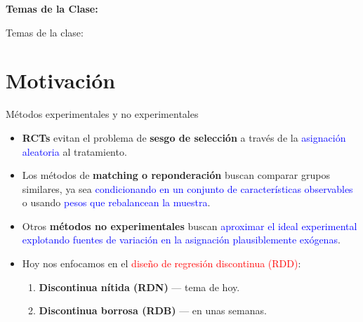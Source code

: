 \documentclass[10pt, xcolor=dvipsnames]{beamer}
\subtitle{Diseño de Regresión Discontinua (RDD)}
\begin{document}
	\beamertemplatenavigationsymbolsempty	
\begin{frame}[plain]%
	\titlepage
	\vspace{-0.4cm}
\textbf{Temas de la Clase:} \\ \vspace{0.3cm}
	\tableofcontents
\end{frame}

\begin{frame}{Temas de la clase:}
	\tableofcontents
\end{frame}

\section{Motivación}

\begin{frame}{Métodos experimentales y no experimentales}
\begin{itemize}
	\item \textbf{RCTs} evitan el problema de \textbf{sesgo de selección} a través de la \textcolor{blue}{asignación aleatoria} al tratamiento. \smallspace
	\item Los métodos de \textbf{matching o reponderación} buscan comparar grupos similares, ya sea \textcolor{blue}{condicionando en un conjunto de características observables} o usando \textcolor{blue}{pesos que rebalancean la muestra}. \smallspace
	\item Otros \textbf{métodos no experimentales} buscan \textcolor{blue}{aproximar el ideal experimental explotando fuentes de variación en la asignación plausiblemente exógenas}. \smallspace
    \item Hoy nos enfocamos en el \textcolor{red}{diseño de regresión discontinua (RDD)}:
    \begin{enumerate}
        \item \textbf{Discontinua nítida (RDN)} — tema de hoy.
        \item \textbf{Discontinua borrosa (RDB)} — en unas semanas.
    \end{enumerate}
\end{itemize}
\end{frame}
\end{document}
